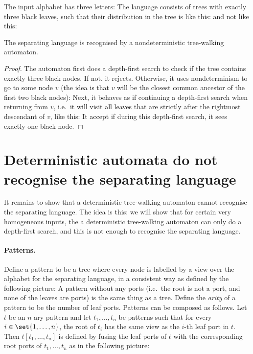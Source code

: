 The input alphabet has three letters:
The language consists of trees with exactly three black leaves, such that  their distribution in the tree is like this: 
and not like this:
\begin{lemma}\label{lem:ntwa}
The separating language is recognised by a nondeterministic tree-walking automaton.
\end{lemma}
\begin{proof}
The automaton first does a depth-first search to check if the tree contains exactly three black nodes. If not, it rejects. Otherwise, it uses nondeterminism to go to some node $v$ (the idea is that $v$ will be the closest common ancestor of the first two black nodes):
Next, it behaves as if continuing a depth-first search when returning from $v$, i.e.~it will visit all leaves that are strictly after the rightmost descendant of $v$, like this:
It accept if during this depth-first search, it sees exactly one black node. 
\end{proof}


\section{Deterministic  automata do not recognise the separating language}
It remains to show that a deterministic tree-walking automaton cannot recognise the separating language. The idea is this: we will show that for certain very homogeneous inputs, the a deterministic tree-walking automaton can only do a depth-first search, and this is not enough to recognise the separating language.

\paragraph*{Patterns.} Define a pattern to be a tree where every node is labelled by a view over the alphabet for the separating language, in a consistent way as defined by the following picture:
A pattern without any ports (i.e.~the root is not a port, and none of the leaves are ports) is the same thing as a tree.  Define the \emph{arity} of a pattern to be the number of leaf ports. Patterns can be composed as follows. Let $t$ be an $n$-ary pattern and let  $t_1,\ldots,t_n$ be patterns such that for every  $i \in \set{1,\ldots,n}$, the root of $t_i$  has the  same view as the $i$-th leaf port in $t$. Then $t[t_1,\ldots,t_n]$ is defined by fusing the leaf ports of $t$ with the corresponding root ports of $t_1,\ldots,t_n$  as in the following picture:

